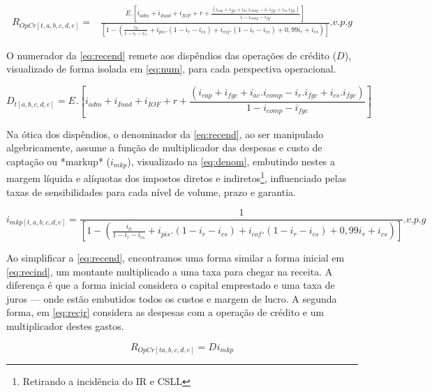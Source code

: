 \documentclass[
  12pt,
  12pt,
  openright,
  oneside,
  a4paper,
  chapter=TITLE,
  section=TITLE,
  subsection=TITLE,
  subsubsection=TITLE,
  english,
  portugues,
  sumario=tradicional]{abntex2}
\begin{document}
\begin{apendicesenv}
\begin{equation}\label{eq:recend}
\begin{aligned}
R_{OpCr[t,a,b,c,d,e]} = & \frac{E_{}.[i_{adm} + i_{Inad} + i_{IOF} + r +  \frac{(i_{cap} + i_{fgc} + i_{ac}.i_{comp} - i_{r}.i_{fgc}+ i_{cs}.i_{fgc})}{1 - i_{comp} - i_{fgc}}]}
{[1 - (\frac{i_{ll}}{1 - i_{r} - i_{cs}} + i_{pis}.(1 - i_{r} - i_{cs}) + i_{cof}.(1 - i_{r} - i_{cs}) + 0,99i_{r} + i_{cs})]}.v.p.g
\end{aligned}
\end{equation}


O numerador da \autoref{eq:recend} remete aos dispêndios das operações de crédito ($D$), visualizado de forma isolada em \autoref{eq:num}, para cada perspectiva operacional.


\begin{equation}\label{eq:num}
D_{t[a,b,c,d,e]} = E_{}.[i_{adm} + i_{Inad} + i_{IOF} + r +  \frac{(i_{cap} + i_{fgc} + i_{ac}.i_{comp} - i_{r}.i_{fgc}+ i_{cs}.i_{fgc})}{1 - i_{comp} - i_{fgc}}]
\end{equation}


Na ótica dos dispêndios, o denominador da \autoref{eq:recend}, ao ser manipulado algebricamente, assume a função de multiplicador das despesas e custo de captação ou *markup* ($i_{mkp}$), visualizado na \autoref{eq:denom}, embutindo nestes a margem líquida e alíquotas dos impostos diretos e indiretos\footnote{Retirando a incidência do IR e CSLL}, influenciado pelas taxas de sensibilidades para cada nível de volume, prazo e garantia. 


\begin{equation}\label{eq:denom}
i_{mkp[t,a,b,c,d,e]} = \frac{1}{[1 - (\frac{i_{ll}}{1 - i_{r} - i_{cs}} + i_{pis}.(1 - i_{r} - i_{cs}) + i_{cof}.(1 - i_{r} - i_{cs}) + 0,99i_{r} + i_{cs})]}.v.p.g
\end{equation}


Ao simplificar a \autoref{eq:recend}, encontramos uma forma similar a forma inicial em \autoref{eq:recind}, um montante multiplicado a uma taxa para chegar na receita. A diferença é que a forma inicial considera o capital emprestado e uma taxa de juros — onde estão embutidos todos os custos e margem de lucro. A segunda forma, em \autoref{eq:recjr} considera as despesas com a operação de crédito e um multiplicador destes gastos.


\begin{equation}\label{eq:recjr}
R_{OpCr[ta,b,c,d,e]} = D_{} i_{mkp}
\end{equation}



\end{apendicesenv}
\end{document}
